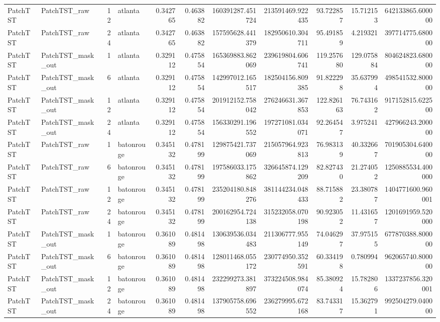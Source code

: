 \begin{longtable}{llrlrrrrrrr}
PatchTST & PatchTST\_raw & 12 & atlanta & 0.342765 & 0.463882 & 160391287.451724 & 213591469.922435 & 93.722857 & 15.712153 & 642133865.600000 \\
PatchTST & PatchTST\_raw & 24 & atlanta & 0.342765 & 0.463882 & 157595628.441379 & 182950610.304711 & 95.491859 & 4.219321 & 397714775.680000 \\
PatchTST & PatchTST\_mask\_out & 1 & atlanta & 0.329112 & 0.475854 & 165369883.862069 & 239619804.606741 & 119.257680 & 129.075884 & 804624823.680000 \\
PatchTST & PatchTST\_mask\_out & 6 & atlanta & 0.329112 & 0.475854 & 142997012.165517 & 182504156.809385 & 91.822298 & 35.637994 & 498541532.800000 \\
PatchTST & PatchTST\_mask\_out & 12 & atlanta & 0.329112 & 0.475854 & 201912152.758042 & 276246631.367853 & 122.826163 & 76.743162 & 917152815.622500 \\
PatchTST & PatchTST\_mask\_out & 24 & atlanta & 0.329112 & 0.475854 & 156330291.196552 & 197271081.034071 & 92.264547 & 3.975241 & 427966243.200000 \\
PatchTST & PatchTST\_raw & 1 & batonrouge & 0.345132 & 0.478199 & 129875421.737069 & 215057964.923813 & 76.983139 & 40.332667 & 701905304.640000 \\
PatchTST & PatchTST\_raw & 6 & batonrouge & 0.345132 & 0.478199 & 197586033.175862 & 326645874.129209 & 82.827430 & 21.274052 & 1250885534.400000 \\
PatchTST & PatchTST\_raw & 12 & batonrouge & 0.345132 & 0.478199 & 235204180.848276 & 381144234.048433 & 88.715882 & 23.380787 & 1404771600.960001 \\
PatchTST & PatchTST\_raw & 24 & batonrouge & 0.345132 & 0.478199 & 200162954.724138 & 315232058.070198 & 90.923052 & 11.431657 & 1201691959.520000 \\
PatchTST & PatchTST\_mask\_out & 1 & batonrouge & 0.361089 & 0.481498 & 130639536.034483 & 211306777.955149 & 74.046297 & 37.975155 & 677870388.800000 \\
PatchTST & PatchTST\_mask\_out & 6 & batonrouge & 0.361089 & 0.481498 & 128011468.055172 & 230774950.352591 & 60.334198 & 0.780994 & 962065740.800000 \\
PatchTST & PatchTST\_mask\_out & 12 & batonrouge & 0.361089 & 0.481498 & 232299273.381897 & 373224508.984074 & 85.380924 & 15.782806 & 1337237856.320001 \\
PatchTST & PatchTST\_mask\_out & 24 & batonrouge & 0.361089 & 0.481498 & 137905758.696552 & 236279995.672168 & 83.743317 & 15.362791 & 992504279.040000 \\

\end{longtable}
